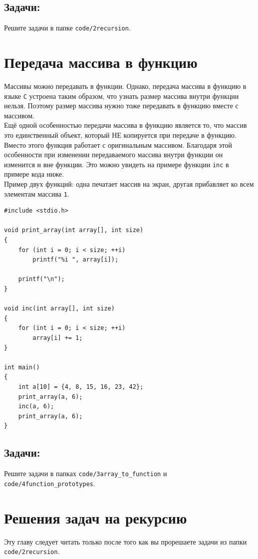 \documentclass{article}
\begin{document}
\subsection*{Задачи:}
Решите задачи в папке \texttt{code/2recursion}.

\newpage
\section*{Передача массива в функцию}
Массивы можно передавать в функции. Однако, передача массива в функцию в языке \texttt{C} устроена таким образом, что узнать размер массива внутри функции нельзя. Поэтому размер массива нужно тоже передавать в функцию вместе с массивом.\\

Ещё одной особенностью передачи массива в функцию является то, что массив это единственный объект, который НЕ копируется при передаче в функцию. Вместо этого функция работает с оригинальным массивом. Благодаря этой особенности при изменении передаваемого массива внутри функции он изменится и вне функции. Это можно увидеть на примере функции \texttt{inc} в примере кода ниже.\\

Пример двух функций: одна печатает массив на экран, другая прибавляет ко всем элементам массива \texttt{1}.
\begin{lstlisting}
#include <stdio.h>

void print_array(int array[], int size) 
{
    for (int i = 0; i < size; ++i)
        printf("%i ", array[i]);
        
    printf("\n");
}

void inc(int array[], int size) 
{
    for (int i = 0; i < size; ++i)
        array[i] += 1;
}

int main() 
{
    int a[10] = {4, 8, 15, 16, 23, 42};
    print_array(a, 6);
    inc(a, 6);
    print_array(a, 6);
}
\end{lstlisting}


\subsection*{Задачи:}
Решите задачи в папках \texttt{code/3array\_to\_function} и \texttt{code/4function\_prototypes}.

\newpage
\section*{Решения задач на рекурсию}
Эту главу следует читать только после того как вы прорешаете задачи из папки \texttt{code/2recursion}.
\end{document}
